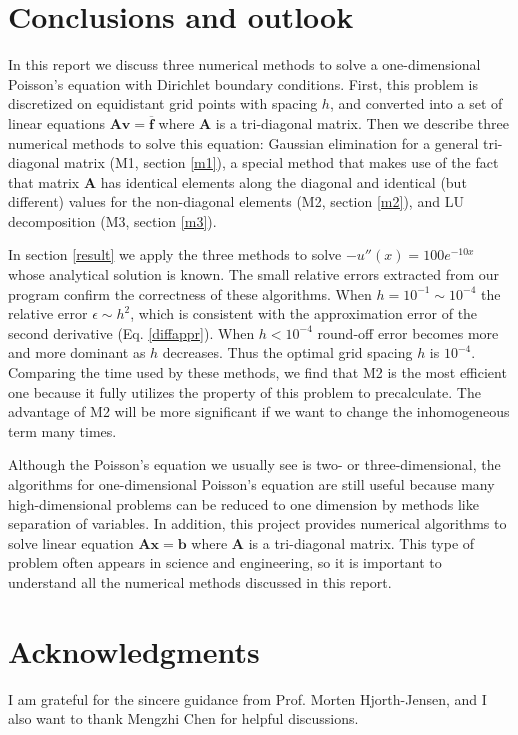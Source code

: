 \documentclass{article}
\begin{document}
	\section{Conclusions and outlook}\label{conclude}
	In this report we discuss three numerical methods to solve a one-dimensional Poisson's equation 
	with Dirichlet boundary conditions. 
	First, this problem is discretized on equidistant grid points with spacing $h$, and converted into a set of linear equations 
	$\mathbf{A}\mathbf{v} = \overline{\mathbf{f}}$ where $\mathbf{A}$ is a tri-diagonal matrix. 
	Then we describe three numerical methods to solve this equation: 
	Gaussian elimination for a general tri-diagonal matrix (M1, section \ref{m1}), 
	a special method that makes use of the fact that matrix $\mathbf{A}$ has identical elements along the diagonal and identical (but different) values for the non-diagonal elements (M2, section \ref{m2}), 
	and LU decomposition (M3, section \ref{m3}). 
	\par
	In section \ref{result} we apply the three methods to solve $-u''(x)=100 e^{-10x}$ whose analytical solution is known. 
	The small relative errors extracted from our program confirm the correctness of these algorithms. 
	When $h=10^{-1} \sim 10^{-4}$ the relative error $\epsilon \sim h^2$, which is consistent with the approximation error
	of the second derivative (Eq. \ref{diffappr}). When $h<10^{-4}$ round-off error becomes more and more dominant as $h$ decreases. 
	Thus the optimal grid spacing $h$ is $10^{-4}$. 
	Comparing the time used by these methods, we find that M2 is the most efficient one 
	because it fully utilizes the property of this problem to precalculate. 
	The advantage of M2 will be more significant if we want to change the inhomogeneous term many times. 
	\par
	Although the Poisson's equation we usually see is two- or three-dimensional, 
	the algorithms for one-dimensional Poisson's equation are still useful because
	many high-dimensional problems can be reduced to one dimension by methods like separation of variables. 
	In addition, this project provides numerical algorithms to solve linear equation $\mathbf{A}\mathbf{x}=\mathbf{b}$ 
	where $\mathbf{A}$ is a tri-diagonal matrix. 
	This type of problem often appears in science and engineering, so it is important to understand
	all the numerical methods discussed in this report. 
	
	\section*{Acknowledgments}
	I am grateful for the sincere guidance from Prof. Morten Hjorth-Jensen, and
	I also want to thank Mengzhi Chen for helpful discussions. 
	
	\nocite{*} 
	
	
\end{document}
